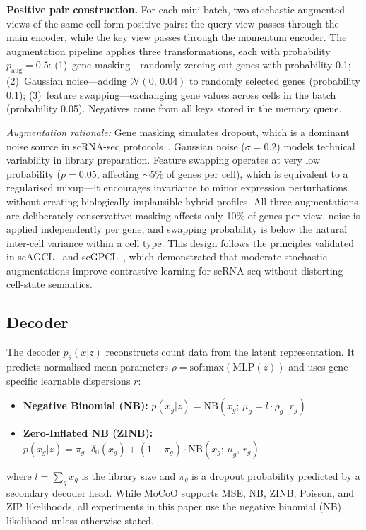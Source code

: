 \documentclass[biology,article,submit,pdftex]{Definitions/mdpi}
\begin{document}
\textbf{Positive pair construction.} For each mini-batch, two stochastic augmented views of the same cell form positive pairs: the query view passes through the main encoder, while the key view passes through the momentum encoder. The augmentation pipeline applies three transformations, each with probability $p_{\mathrm{aug}}{=}0.5$: (1)~gene masking---randomly zeroing out genes with probability 0.1; (2)~Gaussian noise---adding $\mathcal{N}(0,\,0.04)$ to randomly selected genes (probability 0.1); (3)~feature swapping---exchanging gene values across cells in the batch (probability 0.05). Negatives come from all keys stored in the memory queue.

\textit{Augmentation rationale:} Gene masking simulates dropout, which is a dominant noise source in scRNA-seq protocols~\cite{hicks2018missing}. Gaussian noise ($\sigma{=}0.2$) models technical variability in library preparation. Feature swapping operates at very low probability ($p{=}0.05$, affecting ${\sim}5\%$ of genes per cell), which is equivalent to a regularised mixup---it encourages invariance to minor expression perturbations without creating biologically implausible hybrid profiles. All three augmentations are deliberately conservative: masking affects only 10\% of genes per view, noise is applied independently per gene, and swapping probability is below the natural inter-cell variance within a cell type. This design follows the principles validated in scAGCL~\cite{cai2024scagcl} and scGPCL~\cite{cai2024scgpcl}, which demonstrated that moderate stochastic augmentations improve contrastive learning for scRNA-seq without distorting cell-state semantics.

\subsection{Decoder}
\label{sec:method:decoder}

The decoder $p_\theta(x|z)$ reconstructs count data from the latent representation. It predicts normalised mean parameters $\rho = \mathrm{softmax}(\mathrm{MLP}(z))$ and uses gene-specific learnable dispersions $r$:
\begin{itemize}
    \item \textbf{Negative Binomial (NB):} $p(x_g | z) = \mathrm{NB}(x_g;\, \mu_g = l \cdot \rho_g,\, r_g)$
    \item \textbf{Zero-Inflated NB (ZINB):} $p(x_g | z) = \pi_g \cdot \delta_0(x_g) + (1 - \pi_g) \cdot \mathrm{NB}(x_g;\, \mu_g,\, r_g)$
\end{itemize}
where $l = \sum_g x_g$ is the library size and $\pi_g$ is a dropout probability predicted by a secondary decoder head. While MoCoO supports MSE, NB, ZINB, Poisson, and ZIP likelihoods, all experiments in this paper use the negative binomial (NB) likelihood unless otherwise stated.
\end{document}
